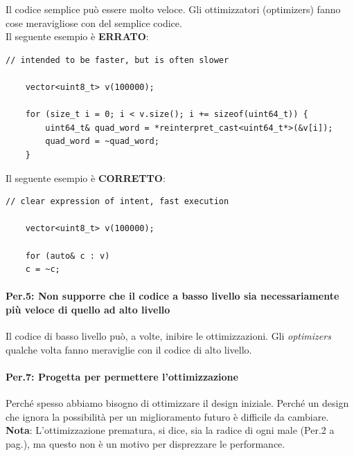 \textsf{\small Il codice semplice può essere molto veloce. Gli ottimizzatori (optimizers) fanno cose meravigliose con del semplice codice. } \\

\textsf{\small Il seguente esempio è \textbf{\color{red}ERRATO}\normalcolor:}

\begin{lstlisting}[frame=single, rulecolor=\color{red}]
	// intended to be faster, but is often slower
	
	vector<uint8_t> v(100000);
	
	for (size_t i = 0; i < v.size(); i += sizeof(uint64_t)) {
		uint64_t& quad_word = *reinterpret_cast<uint64_t*>(&v[i]);
		quad_word = ~quad_word;
	}
\end{lstlisting}

\textsf{\small Il seguente esempio è \textbf{\color{ForestGreen}CORRETTO}\normalcolor:}

\begin{lstlisting}[frame=single, rulecolor=\color{ForestGreen}]
	// clear expression of intent, fast execution
	
	vector<uint8_t> v(100000);
	
	for (auto& c : v)
	c = ~c;
\end{lstlisting}

\paragraph{Per.5: Non supporre che il codice a basso livello sia necessariamente più veloce di quello ad alto livello}

\textsf{\small Il codice di basso livello può, a volte, inibire le ottimizzazioni. Gli \emph{optimizers} qualche volta fanno meraviglie con il codice di alto livello.} \\

\paragraph{Per.7: Progetta per permettere l'ottimizzazione}

\textsf{\small Perché spesso abbiamo bisogno di ottimizzare il design iniziale. Perché un design che ignora la possibilità per un miglioramento futuro è difficile da cambiare.} \\

\textsf{\small \textbf{Nota}: L'ottimizzazione prematura, si dice, sia la radice di ogni male (Per.2 a pag.\pageref{Per_2}), ma questo non è un motivo per disprezzare le performance. } \\

